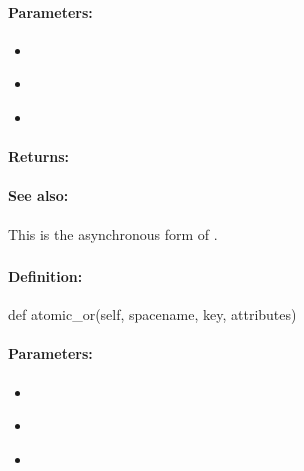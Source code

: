 \paragraph{Parameters:}
\begin{itemize}[noitemsep]
\item {}\\

\item {}\\

\item {}\\

\end{itemize}

\paragraph{Returns:}


\paragraph{See also:}  This is the asynchronous form of .

\pagebreak
\subsubsection{}
\label{api:python:atomic_or}


\paragraph{Definition:}
\begin{pythoncode}
def atomic_or(self, spacename, key, attributes)
\end{pythoncode}

\paragraph{Parameters:}
\begin{itemize}[noitemsep]
\item {}\\

\item {}\\

\item {}\\

\end{itemize}

